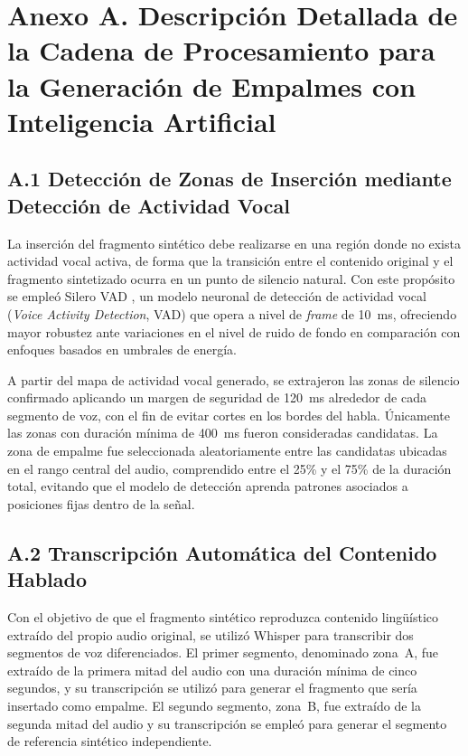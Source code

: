 \section*{Anexo A. Descripción Detallada de la Cadena de Procesamiento para la Generación de Empalmes con Inteligencia Artificial}

\subsection*{A.1 Detección de Zonas de Inserción mediante Detección de Actividad Vocal}

La inserción del fragmento sintético debe realizarse en una región donde no exista
actividad vocal activa, de forma que la transición entre el contenido original y el
fragmento sintetizado ocurra en un punto de silencio natural. Con este propósito se
empleó Silero VAD \cite{silero_vad}, un modelo neuronal de detección de actividad
vocal (\textit{Voice Activity Detection}, VAD) que opera a nivel de \textit{frame} de
10~ms, ofreciendo mayor robustez ante variaciones en el nivel de ruido de fondo en
comparación con enfoques basados en umbrales de energía.

A partir del mapa de actividad vocal generado, se extrajeron las zonas de silencio
confirmado aplicando un margen de seguridad de 120~ms alrededor de cada segmento
de voz, con el fin de evitar cortes en los bordes del habla. Únicamente las zonas con
duración mínima de 400~ms fueron consideradas candidatas. La zona de empalme fue
seleccionada aleatoriamente entre las candidatas ubicadas en el rango central del audio,
comprendido entre el 25\% y el 75\% de la duración total, evitando que el modelo de
detección aprenda patrones asociados a posiciones fijas dentro de la señal.

\subsection*{A.2 Transcripción Automática del Contenido Hablado}

Con el objetivo de que el fragmento sintético reproduzca contenido lingüístico extraído
del propio audio original, se utilizó Whisper \cite{whisper} para transcribir dos
segmentos de voz diferenciados. El primer segmento, denominado zona~A, fue extraído
de la primera mitad del audio con una duración mínima de cinco segundos, y su
transcripción se utilizó para generar el fragmento que sería insertado como empalme.
El segundo segmento, zona~B, fue extraído de la segunda mitad del audio y su
transcripción se empleó para generar el segmento de referencia sintético independiente.

